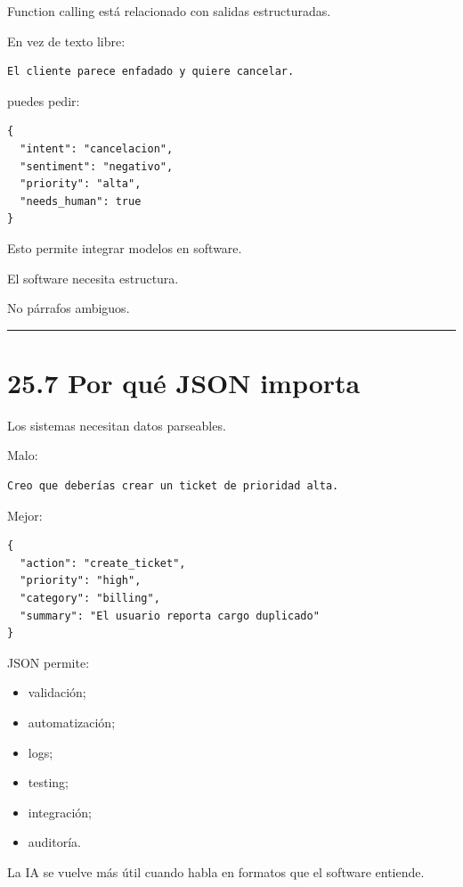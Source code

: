 Function calling está relacionado con salidas estructuradas.

En vez de texto libre:

\begin{lstlisting}
El cliente parece enfadado y quiere cancelar.
\end{lstlisting}

puedes pedir:

\begin{lstlisting}
{
  "intent": "cancelacion",
  "sentiment": "negativo",
  "priority": "alta",
  "needs_human": true
}
\end{lstlisting}

Esto permite integrar modelos en software.

El software necesita estructura.

No párrafos ambiguos.

\begin{center}\rule{0.5\linewidth}{0.5pt}\end{center}

\section{25.7 Por qué JSON importa}\label{por-quuxe9-json-importa}

Los sistemas necesitan datos parseables.

Malo:

\begin{lstlisting}
Creo que deberías crear un ticket de prioridad alta.
\end{lstlisting}

Mejor:

\begin{lstlisting}
{
  "action": "create_ticket",
  "priority": "high",
  "category": "billing",
  "summary": "El usuario reporta cargo duplicado"
}
\end{lstlisting}

JSON permite:

\begin{itemize}
\tightlist
\item
  validación;
\item
  automatización;
\item
  logs;
\item
  testing;
\item
  integración;
\item
  auditoría.
\end{itemize}

La IA se vuelve más útil cuando habla en formatos que el software
entiende.

